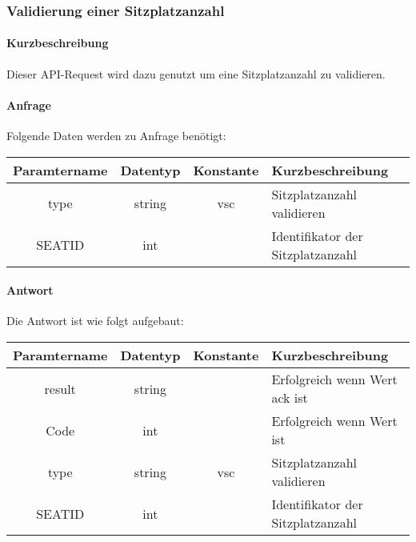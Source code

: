 \subsubsection{Validierung einer Sitzplatzanzahl}
\paragraph{Kurzbeschreibung}Dieser API-Request wird dazu genutzt um eine Sitzplatzanzahl zu validieren.
\paragraph{Anfrage}Folgende Daten werden zu Anfrage benötigt:
\begin{table}[H]
	\begin{tabular}{|c|c|c|p{6.5cm}|}
		\hline
		\textbf{Paramtername} & \textbf{Datentyp} & \textbf{Konstante} & \textbf{Kurzbeschreibung}                                                                                               \\ \hline
		type                & string            & vsc                & Sitzplatzanzahl validieren \\ \hline
		SEATID              & int               &                    & Identifikator der Sitzplatzanzahl \\ \hline
	\end{tabular}
\end{table}
\paragraph{Antwort}Die Antwort ist wie folgt aufgebaut:
\begin{table}[H]
	\begin{tabular}{|c|c|c|p{6.5cm}|}
		\hline
		\textbf{Paramtername} & \textbf{Datentyp} & \textbf{Konstante} & \textbf{Kurzbeschreibung}                                                                                               \\ \hline
		result              & string           &                 & Erfolgreich wenn Wert {\glqq ack\grqq} ist \\ \hline
		Code                & int              &                 & Erfolgreich wenn Wert {\glqq 0\grqq} ist \\ \hline
		type                & string           & vsc             & Sitzplatzanzahl validieren \\ \hline
		SEATID              & int              &                 & Identifikator der Sitzplatzanzahl \\ \hline
	\end{tabular}
\end{table}
